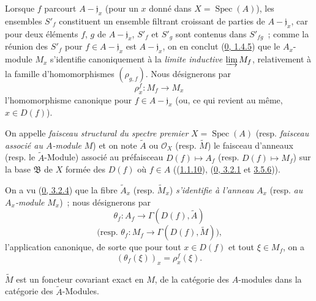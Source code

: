 Lorsque $f$ parcourt $A-\mathfrak{j}_x$ (pour un $x$ donné dans
$X=\operatorname{Spec}(A)$), les ensembles $S'_f$ constituent un ensemble
filtrant croissant de parties de $A-\mathfrak{j}_x$, car pour deux éléments
$f$, $g$ de $A-\mathfrak{j}_x$, $S'_f$ et $S'_g$ sont contenus dans
$S'_{fg}$~; comme la réunion des $S'_f$ pour $f\in A-\mathfrak{j}_x$ est
$A-\mathfrak{j}_x$, on en conclut (\hyperref[0.1.4.5-fr]{0, 1.4.5}) que le
$A_x$-module $M_x$ s'identifie canoniquement à la \emph{limite inductive}
$\varinjlim M_f$, relativement à la famille d'homomorphismes
$(\rho_{g,f})$. Nous désignerons par
\[
  \rho_x^f:M_f\longrightarrow M_x
\]
l'homomorphisme canonique pour $f\in A-\mathfrak{j}_x$ (ou, ce qui revient au
même, $x\in D(f)$).

\begin{definition}[1.3.4]
\label{I.1.3.4-fr}
On appelle \emph{faisceau structural du spectre premier}
$X=\operatorname{Spec}(A)$ (resp. \emph{faisceau associé au $A$-module}
$M$) et on note $\widetilde{A}$ ou $\mathscr{O}_X$ (resp. $\widetilde{M}$) le
faisceau d'anneaux (resp. le $\widetilde{A}$-Module) associé au préfaisceau
$D(f)\mapsto A_f$ (resp. $D(f)\mapsto M_f$) sur la base $\mathfrak{B}$ de
$X$ formée des $D(f)$ où $f\in A$
((\hyperref[I.1.1.10-fr]{1.1.10}),
(\hyperref[0.3.2.1-fr]{0, 3.2.1} et
\hyperref[0.3.5.6-fr]{3.5.6})).
\end{definition}

On a vu (\hyperref[0.3.2.4-fr]{0, 3.2.4}) que la fibre
$\widetilde{A}_x$ (resp. $\widetilde{M}_x$) \emph{s'identifie à l'anneau}
$A_x$ (resp. \emph{au $A_x$-module} $M_x$)~; nous désignerons par
\[
  \theta_f:A_f\longrightarrow\Gamma(D(f),\widetilde{A})
\]
\[
  \text{(resp. }\theta_f:M_f\longrightarrow
  \Gamma(D(f),\widetilde{M})\text{),}
\]
l'application canonique, de sorte que pour tout $x\in D(f)$ et tout
$\xi\in M_f$, on a
\begin{equation}
  (\theta_f(\xi))_x=\rho_x^f(\xi).
  \tag{1.3.4.1}\label{I.1.3.4.1-fr}
\end{equation}

\begin{proposition}[1.3.5]
\label{I.1.3.5-fr}
$\widetilde{M}$ est un foncteur covariant exact en $M$, de la catégorie des
$A$-modules dans la catégorie des $\widetilde{A}$-Modules.
\end{proposition}

